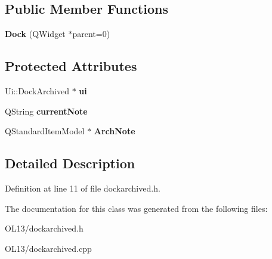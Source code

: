 \subsection*{Public Member Functions}
\begin{DoxyCompactItemize}
\item 
\mbox{\label{class_dock_a1e81e2926e94969514ac45a9d839731c}} 
{\bfseries Dock} (Q\+Widget $\ast$parent=0)
\end{DoxyCompactItemize}
\subsection*{Protected Attributes}
\begin{DoxyCompactItemize}
\item 
\mbox{\label{class_dock_a525f557d9a2670640105da2f1e605026}} 
Ui\+::\+Dock\+Archived $\ast$ {\bfseries ui}
\item 
\mbox{\label{class_dock_a6af86621e3df52266a582e464324e6d2}} 
Q\+String {\bfseries current\+Note}
\item 
\mbox{\label{class_dock_a484517393b214e1c3abe0c7b36596172}} 
Q\+Standard\+Item\+Model $\ast$ {\bfseries Arch\+Note}
\end{DoxyCompactItemize}


\subsection{Detailed Description}


Definition at line 11 of file dockarchived.\+h.



The documentation for this class was generated from the following files\+:\begin{DoxyCompactItemize}
\item 
O\+L13/dockarchived.\+h\item 
O\+L13/dockarchived.\+cpp\end{DoxyCompactItemize}
